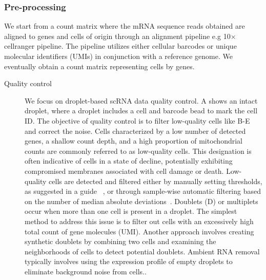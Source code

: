 \subsubsection{Pre-processing}
We start from a count matrix where the mRNA sequence reads obtained are aligned to genes and cells of origin through an alignment pipeline e.g 10$\times$ cellranger pipeline. The pipeline utilizes either cellular barcodes or unique molecular identifiers (UMIs) in conjunction with a reference genome. We eventually obtain a count matrix representing cells by genes. 
\begin{description}
	\item[Quality control] 
	We focus on droplet-based scRNA data quality control. A shows an intact droplet, where a droplet includes a cell and barcode bead to mark the cell ID. The objective of quality control is to filter low-quality cells like B-E and correct the noise. Cells characterized by a low number of detected genes, a shallow count depth, and a high proportion of mitochondrial counts are commonly referred to as low-quality cells. This designation is often indicative of cells in a state of decline, potentially exhibiting compromised membranes associated with cell damage or death. Low-quality cells are detected and filtered either by manually setting thresholds, as suggested in a guide ~\citep{luecken2019current}, or through sample-wise automatic filtering based on the number of median absolute deviations~\citep{germain2020pipecomp}. Doublets (D) or multiplets occur when more than one cell is present in a droplet. The simplest method to address this issue is to filter out cells with an excessively high total count of gene molecules (UMI). Another approach involves creating synthetic doublets by combining two cells and examining the neighborhoods of cells to detect potential doublets\citep{granja2021archr}. Ambient RNA removal typically involves using the expression profile of empty droplets to eliminate background noise from cells.\citep{janssen2023benchambient}.



\end{description}
